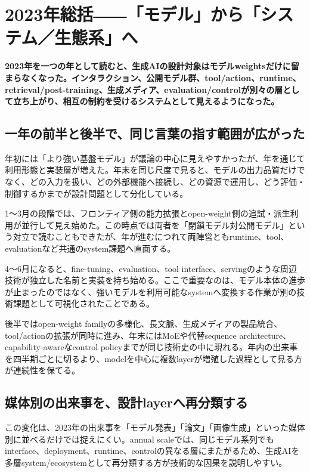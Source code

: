 \section{2023年総括――「モデル」から「システム／生態系」へ}
\noindent\textbf{2023年を一つの年として読むと、生成AIの設計対象はモデルweightsだけに留まらなくなった。インタラクション、公開モデル群、tool/action、runtime、retrieval/post-training、生成メディア、evaluation/controlが別々の層として立ち上がり、相互の制約を受けるシステムとして見えるようになった。}

\subsection{一年の前半と後半で、同じ言葉の指す範囲が広がった}

年初には「より強い基盤モデル」が議論の中心に見えやすかったが、年を通じて利用形態と実装層が増えた。年末を同じ尺度で見ると、モデルの出力品質だけでなく、どの入力を扱い、どの外部機能へ接続し、どの資源で運用し、どう評価・制御するかまでが設計問題として分化している。


1〜3月の段階では、フロンティア側の能力拡張とopen-weight側の追試・派生利用が並行して見え始めた。この時点では両者を「閉鎖モデル対公開モデル」という対立で読むこともできたが、年が進むにつれて両陣営ともruntime、tool、evaluationなど共通のsystem課題へ直面する。


4〜6月になると、fine-tuning、evaluation、tool interface、servingのような周辺技術が独立した名前と実装を持ち始める。ここで重要なのは、モデル本体の進歩が止まったのではなく、強いモデルを利用可能なsystemへ変換する作業が別の技術課題として可視化されたことである。


後半ではopen-weight familyの多様化、長文脈、生成メディアの製品統合、tool/actionの拡張が同時に進み、年末にはMoEや代替sequence architecture、capability-awareなcontrol policyまでが同じ技術史の中に現れる。年内の出来事を四半期ごとに切るより、modelを中心に複数layerが増殖した過程として見る方が連続性を保てる。


\subsection{媒体別の出来事を、設計layerへ再分類する}

この変化は、2023年の出来事を「モデル発表」「論文」「画像生成」といった媒体別に並べるだけでは捉えにくい。annual scaleでは、同じモデル系列でもinterface、deployment、runtime、controlの異なる層にまたがるため、生成AIを多層system/ecosystemとして再分類する方が技術的な因果を説明しやすい。



